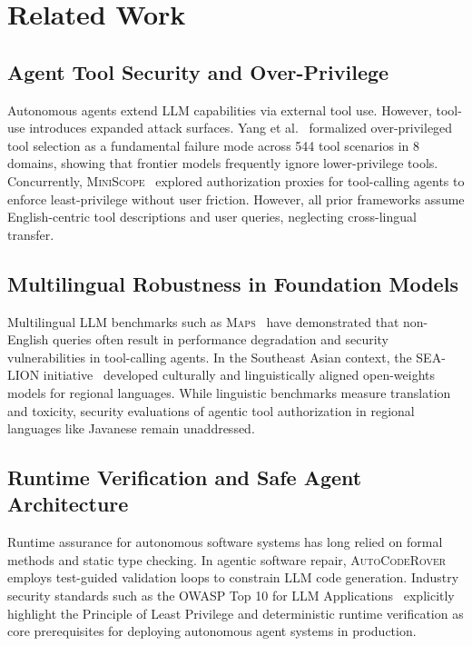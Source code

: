\section{Related Work}
\label{sec:related_work}

\subsection{Agent Tool Security and Over-Privilege}
Autonomous agents extend LLM capabilities via external tool use. However, tool-use introduces expanded attack surfaces. Yang et al.~\cite{yang2026when} formalized over-privileged tool selection as a fundamental failure mode across 544 tool scenarios in 8 domains, showing that frontier models frequently ignore lower-privilege tools. Concurrently, \textsc{MiniScope}~\cite{zhu2025miniscope} explored authorization proxies for tool-calling agents to enforce least-privilege without user friction. However, all prior frameworks assume English-centric tool descriptions and user queries, neglecting cross-lingual transfer.

\subsection{Multilingual Robustness in Foundation Models}
Multilingual LLM benchmarks such as \textsc{Maps}~\cite{maps2025} have demonstrated that non-English queries often result in performance degradation and security vulnerabilities in tool-calling agents. In the Southeast Asian context, the \textsc{SEA-LION} initiative~\cite{aisingapore2024sealion} developed culturally and linguistically aligned open-weights models for regional languages. While linguistic benchmarks measure translation and toxicity, security evaluations of agentic tool authorization in regional languages like Javanese remain unaddressed.

\subsection{Runtime Verification and Safe Agent Architecture}
Runtime assurance for autonomous software systems has long relied on formal methods and static type checking. In agentic software repair, \textsc{AutoCodeRover}~\cite{zhang2024autocoderover} employs test-guided validation loops to constrain LLM code generation. Industry security standards such as the OWASP Top 10 for LLM Applications~\cite{owasp2025llm} explicitly highlight the Principle of Least Privilege and deterministic runtime verification as core prerequisites for deploying autonomous agent systems in production.
